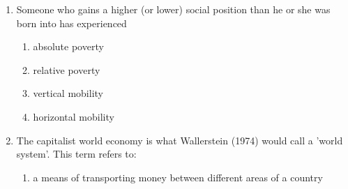 \documentclass[12pt]{article}
\begin{document}
\begin{enumerate}[label=\arabic*.]
\begin{enumerate}[label=(\alph*)]
    \item {\csname fa0044Font0\endcsname\char"0061}{\csname fa0044Font1\endcsname\char"0064}{\csname fa0044Font2\endcsname\char"0075}{\csname fa0044Font3\endcsname\char"006C}{\csname fa0044Font4\endcsname\char"0074}{\csname fa0044Font5\endcsname\char"0073} watch violent or sexually explicit films and then copy the behaviour
    \item audiences challenge the ethnic stereotypes {\csname fa0045Font0\endcsname\char"0070}{\csname fa0045Font1\endcsname\char"0072}{\csname fa0045Font2\endcsname\char"006F}{\csname fa0045Font3\endcsname\char"006D} {\csname fa0046Font0\endcsname\char"006F}{\csname fa0046Font1\endcsname\char"0074}{\csname fa0046Font2\endcsname\char"0065}{\csname fa0046Font3\endcsname\char"0064}{\csname fa0046Font4\endcsname\char"0020} {\csname fa0047Font0\endcsname\char"0062}{\csname fa0047Font1\endcsname\char"0079}{\csname fa0047Font2\endcsname\char"0020}{\csname fa0047Font3\endcsname\char"0073}{\csname fa0047Font4\endcsname\char"006F} {\csname fa0048Font0\endcsname\char"0063}{\csname fa0048Font1\endcsname\char"0069}{\csname fa0048Font2\endcsname\char"0065}{\csname fa0048Font3\endcsname\char"0074}{\csname fa0048Font4\endcsname\char"0079}
    \item {\csname fa0049Font0\endcsname\char"0061}{\csname fa0049Font1\endcsname\char"0063}{\csname fa0049Font2\endcsname\char"0074}{\csname fa0049Font3\endcsname\char"0069}{\csname fa0049Font4\endcsname\char"0076}{\csname fa0049Font5\endcsname\char"0069}{\csname fa0049Font6\endcsname\char"0073}{\csname fa0049Font7\endcsname\char"0074}{\csname fa0049Font8\endcsname\char"0073} express concern with the Americanization of culture
\end{enumerate}
\item Someone who gains a higher (or lower) social position than he or she was born into has experienced
\begin{enumerate}[label=(\alph*)]
    \item absolute poverty
    \item relative poverty
    \item vertical mobility
    \item horizontal mobility
\end{enumerate}
\item The capitalist world economy is what Wallerstein (1974) would call a 'world system'. This term refers to:
\begin{enumerate}[label=(\alph*)]
    \item a means of transporting money between different areas of a country

\end{enumerate}
\end{enumerate}
\end{document}
